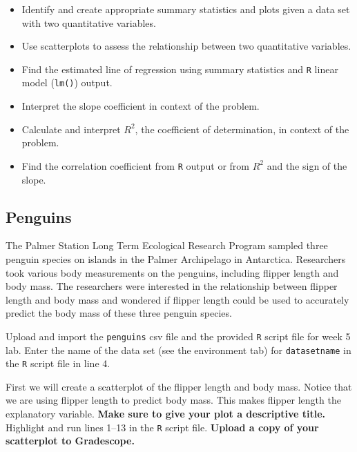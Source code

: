 \documentclass[
]{report}
\begin{document}
\begin{itemize}
\item
  Identify and create appropriate summary statistics and plots
  given a data set with two quantitative variables.
\item
  Use scatterplots to assess the relationship between two quantitative variables.
\item
  Find the estimated line of regression using summary statistics and \texttt{R} linear model (\texttt{lm()}) output.
\item
  Interpret the slope coefficient in context of the problem.
\item
  Calculate and interpret \(R^2\), the coefficient of determination, in context of the problem.
\item
  Find the correlation coefficient from \texttt{R} output or from \(R^2\) and the sign of the slope.
\end{itemize}

\hypertarget{penguins}{%
\subsection{Penguins}\label{penguins}}

The Palmer Station Long Term Ecological Research Program sampled three penguin species on islands in the Palmer Archipelago in Antarctica. Researchers took various body measurements on the penguins, including flipper length and body mass. The researchers were interested in the relationship between flipper length and body mass and wondered if flipper length could be used to accurately predict the body mass of these three penguin species.

Upload and import the \texttt{penguins} csv file and the provided \texttt{R} script file for week 5 lab. Enter the name of the data set (see the environment tab) for \texttt{datasetname} in the \texttt{R} script file in line 4.

First we will create a scatterplot of the flipper length and body mass. Notice that we are using flipper length to predict body mass. This makes flipper length the explanatory variable. \textbf{Make sure to give your plot a descriptive title.} Highlight and run lines 1--13 in the \texttt{R} script file. \textbf{Upload a copy of your scatterplot to Gradescope.}
\end{document}

